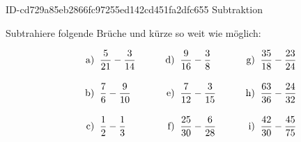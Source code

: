 \begin{exercise}
      {ID-cd729a85eb2866fc97255ed142cd451fa2dfc655}
      {Subtraktion}
  \ifproblem\problem\par
    Subtrahiere folgende Brüche und kürze so weit
    wie möglich:
    \newcommand{\no}[1]
    {%
      \vphantom{\Bigg(}%
      \makebox[3em][r]%
      {%
        #1)%
      }%
      \;\;&%
    }%
    \begin{align*}
      \no{a} \frac{5}{21}-\frac{3}{14} & \no{d} \frac{9}{16}-\frac{3}{8}   & \no{g} \frac{35}{18}-\frac{23}{24} \\
      \no{b} \frac{7}{6}-\frac{9}{10}  & \no{e} \frac{7}{12}-\frac{3}{15}  & \no{h} \frac{63}{36}-\frac{24}{32} \\
      \no{c} \frac{1}{2}-\frac{1}{3}   & \no{f} \frac{25}{30}-\frac{6}{28} & \no{i} \frac{42}{30}-\frac{45}{75}
    \end{align*}
  \fi
\end{exercise}
